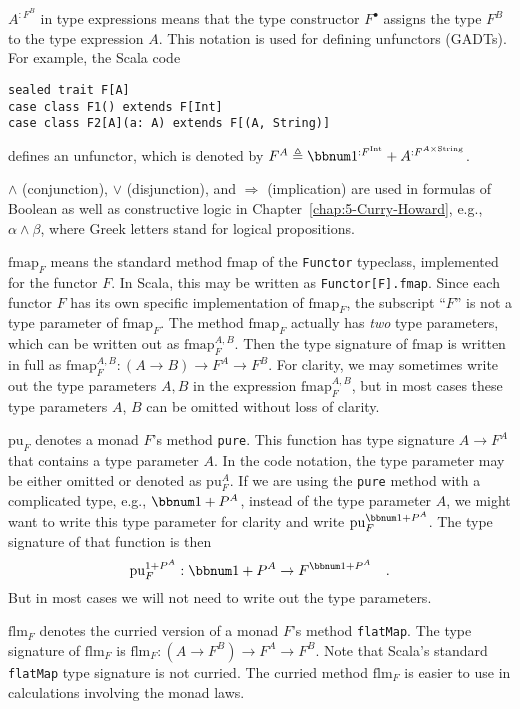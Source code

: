 $A^{:F^{B}}$ in type expressions means that the type constructor
$F^{\bullet}$ assigns the type $F^{B}$ to the type expression $A$.
This notation is used for defining unfunctors (GADTs). For example,
the Scala code

\begin{lstlisting}
sealed trait F[A]
case class F1() extends F[Int]
case class F2[A](a: A) extends F[(A, String)]
\end{lstlisting}
defines an unfunctor, which is denoted by $F^{A}\triangleq\bbnum 1^{:F^{\text{Int}}}+A^{:F^{A\times\text{String}}}$.

$\wedge$ (conjunction), $\vee$ (disjunction), and $\Rightarrow$
(implication) are used in formulas of Boolean as well as constructive
logic in Chapter~\ref{chap:5-Curry-Howard}, e.g., $\alpha\wedge\beta$,
where Greek letters stand for logical propositions.

$\text{fmap}_{F}$ means the standard method $\text{fmap}$ of the
\lstinline!Functor! typeclass, implemented for the functor $F$.
In Scala, this may be written as \texttt{}\lstinline!Functor[F].fmap!.
Since each functor $F$ has its own specific implementation of $\text{fmap}_{F}$,
the subscript \textsf{``}$F$\textsf{''} is not a type parameter of $\text{fmap}_{F}$.
The method $\text{fmap}_{F}$ actually has \emph{two} type parameters,
which can be written out as $\text{fmap}_{F}^{A,B}$. Then the type
signature of $\text{fmap}$ is written in full as $\text{fmap}_{F}^{A,B}:\left(A\rightarrow B\right)\rightarrow F^{A}\rightarrow F^{B}$.
For clarity, we may sometimes write out the type parameters $A,B$
in the expression $\text{fmap}_{F}^{A,B}$, but in most cases these
type parameters $A$, $B$ can be omitted without loss of clarity.

$\text{pu}_{F}$ denotes a monad $F$\textsf{'}s method \lstinline!pure!.
This function has type signature $A\rightarrow F^{A}$ that contains
a type parameter $A$. In the code notation, the type parameter may
be either omitted or denoted as $\text{pu}_{F}^{A}$. If we are using
the \lstinline!pure! method with a complicated type, e.g., $\bbnum 1+P^{A}$,
instead of the type parameter $A$, we might want to write this type
parameter for clarity and write $\text{pu}_{F}^{\bbnum 1+P^{A}}$.
The type signature of that function is then 
\[
\text{pu}_{F}^{1+P^{A}}:\bbnum 1+P^{A}\rightarrow F^{\bbnum 1+P^{A}}\quad.
\]
But in most cases we will not need to write out the type parameters.

$\text{flm}_{F}$ denotes the curried version of a monad $F$\textsf{'}s method
\lstinline!flatMap!. The type signature of $\text{flm}_{F}$ is $\text{flm}_{F}:(A\rightarrow F^{B})\rightarrow F^{A}\rightarrow F^{B}$.
Note that Scala\textsf{'}s standard \lstinline!flatMap! type signature is
not curried. The curried method $\text{flm}_{F}$ is easier to use
in calculations involving the monad laws.

